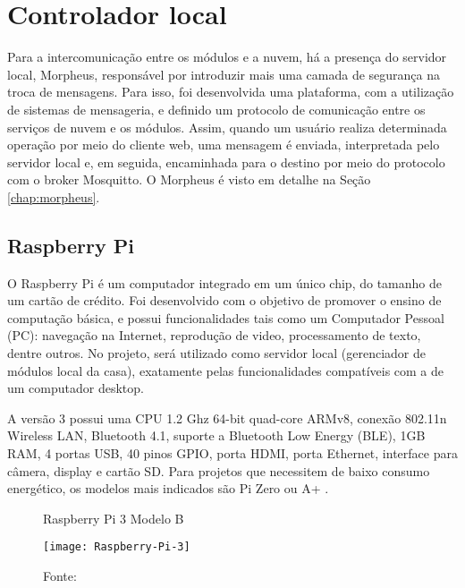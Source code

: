 \section{Controlador local}
Para a intercomunicação entre os módulos e a nuvem, há a presença do servidor local, Morpheus, responsável por introduzir mais uma camada de segurança na troca de mensagens. Para isso, foi desenvolvida uma plataforma, com a utilização de sistemas de mensageria, e definido um protocolo de comunicação entre os serviços de nuvem e os módulos. Assim, quando um usuário realiza determinada operação por meio do cliente web, uma mensagem é enviada, interpretada pelo servidor local e, em seguida, encaminhada para o destino por meio do protocolo \wmqtt{} com o broker Mosquitto. O Morpheus é visto em detalhe na Seção \ref{chap:morpheus}.

\subsection{Raspberry Pi}
O Raspberry Pi é um computador integrado em um único chip, do tamanho de um cartão de crédito. Foi desenvolvido com o objetivo de promover o ensino de computação básica, e possui funcionalidades tais como um Computador Pessoal (PC): navegação na Internet, reprodução de video, processamento de texto, dentre outros. No projeto, será utilizado como servidor local (gerenciador de módulos local da casa), exatamente pelas funcionalidades compatíveis com a de um computador desktop.

A versão 3 possui uma CPU 1.2 Ghz 64-bit quad-core ARMv8, conexão 802.11n Wireless LAN, Bluetooth 4.1, suporte a Bluetooth Low Energy (BLE), 1GB RAM, 4 portas USB, 40 pinos GPIO, porta HDMI, porta Ethernet, interface para câmera, display e cartão SD. Para projetos que necessitem de baixo consumo energético, os modelos mais indicados são Pi Zero ou A+ \cite{raspPi}.

\begin{figure}[H]
	\centering
	\caption{Raspberry Pi 3 Modelo B}
  \texttt{[image: Raspberry-Pi-3]}
	\caption*{Fonte: \cite{raspPi}}
\label{fig:Raspberry-Pi-3}
\end{figure}
